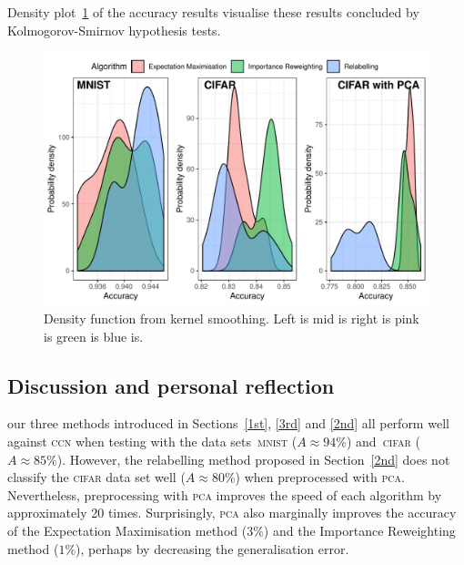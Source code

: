 \documentclass[12pt]{article} %
\begin{document}
Density plot~\ref{fig:Density} of the accuracy results visualise these results concluded by Kolmogorov-Smirnov hypothesis tests.
\begin{figure}
    \centering
	\includegraphics[scale=0.8]{histo}
	\caption{Density function from kernel smoothing. Left is mid is right is pink is green is blue is.}
	\label{fig:Density}
\end{figure}




\subsection{Discussion and personal reflection}




our three methods introduced in Sections~\ref{1st}, \ref{3rd} and \ref{2nd}  all perform well against \textsc{ccn} when testing with the data sets~\textsc{mnist} ($A\approx 94\%$) and~\textsc{cifar} ($A\approx 85\%$). However, the relabelling method proposed in Section~\ref{2nd} does not classify the \textsc{cifar} data set well ($A\approx 80\%$) when preprocessed with \textsc{pca}. Nevertheless, preprocessing with \textsc{pca} improves the speed of each algorithm by approximately 20 times. Surprisingly, \textsc{pca} also marginally improves the accuracy of the Expectation Maximisation method ($3\%$) and the Importance Reweighting method ($1\%$), perhaps by decreasing the generalisation error.
\end{document}

